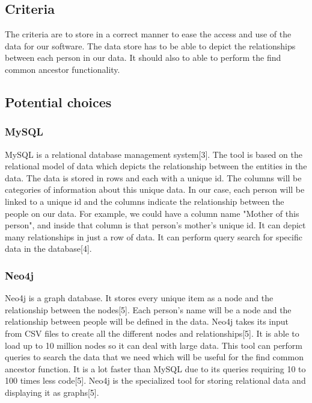 \documentclass[onecolumn, draftclsnofoot,10pt, compsoc]{IEEEtran}
\begin{document}
\subsection{Criteria}
\begin{singlespace}
The criteria are to store in a correct manner to ease the access and use of the data for our software. The data store has to be able to depict the relationships between each person in our data. It should also to able to perform the find common ancestor functionality.
\end{singlespace}

\subsection{Potential choices}


\subsubsection{MySQL}
\begin{singlespace}
MySQL is a relational database management system[3]. The tool is based on the relational model of data which depicts the relationship between the entities in the data. The data is stored in rows and each with a unique id. The columns will be categories of information about this unique data. In our case, each person will be linked to a unique id and the columns indicate the relationship between the people on our data. For example, we could have a column name "Mother of this person", and inside that column is that person's mother's unique id. It can depict many relationships in just a row of data. It can perform query search for specific data in the database[4].
\end{singlespace}

\subsubsection{Neo4j}
\begin{singlespace}
Neo4j is a graph database. It stores every unique item as a node and the relationship between the nodes[5]. Each person's name will be a node and the relationship between people will be defined in the data. Neo4j takes its input from CSV files to create all the different nodes and relationships[5]. It is able to load up to 10 million nodes so it can deal with large data. This tool can perform queries to search the data that we need which will be useful for the find common ancestor function. It is a lot faster than MySQL due to its queries requiring 10 to 100 times less code[5]. Neo4j is the specialized tool for storing relational data and displaying it as graphs[5].
\end{singlespace}
 
\end{document}

